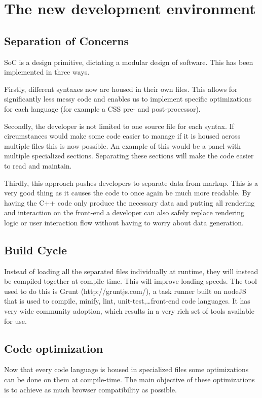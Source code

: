 \documentclass[journal]{IEEEtran}
\begin{document}
\section{The new development environment}
\subsection{Separation of Concerns}
\label{Separation of Concerns}
SoC is a design primitive, dictating a modular design of software. This has
been implemented in three ways.

Firstly, different syntaxes now are housed in their own files. This allows for
significantly less messy code and enables us to implement specific optimizations
for each language (for example a CSS pre- and post-processor).

Secondly, the developer is not limited to one source file for each syntax. If
circumstances would make some code easier to manage if it is housed across
multiple files this is now possible. An example of this would be a panel with
multiple specialized sections. Separating these sections will make the code
easier to read and maintain.

Thirdly, this approach pushes developers to separate data from markup. This is
a very good thing as it causes the code to once again be much more readable.
By having the C++ code only produce the necessary data and putting all rendering
and interaction on the front-end a developer can also safely replace rendering logic or
user interaction flow without having to worry about data generation.

\subsection{Build Cycle}
Instead of loading all the separated files individually at runtime, they will
instead be compiled together at compile-time. This will improve loading speeds.
The tool used to do this is Grunt
(http://gruntjs.com/), a task runner built on nodeJS that is used to compile,
minify, lint, unit-test,\ldots front-end code languages.
It has very wide community adoption, which results in a very rich set of tools
available for use.
\subsection{Code optimization}
Now that every code language is housed in specialized files some
optimizations can be done on them at compile-time. The main objective of these optimizations
is to achieve as much browser compatibility as possible.
\end{document}
